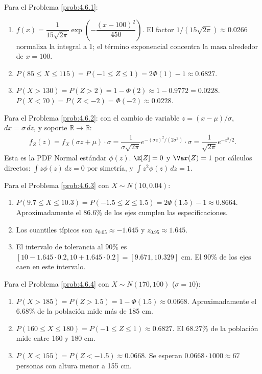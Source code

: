 \begin{solucion}
	\label{sol:4.6.1}
	Para el Problema \ref{prob:4.6.1}:
	\begin{enumerate}
		\item $f(x) = \dfrac{1}{15\sqrt{2\pi}} \exp\left(-\dfrac{(x-100)^{2}}{450}\right)$. El factor $1/(15\sqrt{2\pi}) \approx 0.0266$ normaliza la integral a 1; el término exponencial concentra la masa alrededor de $x = 100$.
		\item $P(85 \le X \le 115) = P(-1 \le Z \le 1) = 2\Phi(1) - 1 \approx 0.6827$.
		\item $P(X > 130) = P(Z > 2) = 1 - \Phi(2) \approx 1 - 0.9772 = 0.0228$. $P(X < 70) = P(Z < -2) = \Phi(-2) \approx 0.0228$.
	\end{enumerate}
\end{solucion}

\begin{solucion}
	\label{sol:4.6.2}
	Para el Problema \ref{prob:4.6.2}: con el cambio de variable $z = (x - \mu)/\sigma$, $dx = \sigma\,dz$, y soporte $\mathbb{R} \to \mathbb{R}$:
	\begin{align*}
		f_{Z}(z) = f_{X}(\sigma z + \mu) \cdot \sigma = \dfrac{1}{\sigma\sqrt{2\pi}} e^{-(\sigma z)^{2}/(2\sigma^{2})} \cdot \sigma = \dfrac{1}{\sqrt{2\pi}} e^{-z^{2}/2}.
	\end{align*}
	Esta es la PDF Normal estándar $\phi(z)$. $\E[Z] = 0$ y $\Var(Z) = 1$ por cálculos directos: $\int z\phi(z)\,dz = 0$ por simetría, y $\int z^{2}\phi(z)\,dz = 1$. \quad \qedhere
\end{solucion}

\begin{solucion}
	\label{sol:4.6.3}
	Para el Problema \ref{prob:4.6.3} con $X \sim N(10, 0.04)$:
	\begin{enumerate}
		\item $P(9.7 \le X \le 10.3) = P(-1.5 \le Z \le 1.5) = 2\Phi(1.5) - 1 \approx 0.8664$. Aproximadamente el 86.6\% de los ejes cumplen las especificaciones.
		\item Los cuantiles típicos son $z_{0.05} \approx -1.645$ y $z_{0.95} \approx 1.645$.
		\item El intervalo de tolerancia al 90\% es $[10 - 1.645 \cdot 0.2, 10 + 1.645 \cdot 0.2] = [9.671, 10.329]$ cm. El 90\% de los ejes caen en este intervalo.
	\end{enumerate}
\end{solucion}

\begin{solucion}
	\label{sol:4.6.4}
	Para el Problema \ref{prob:4.6.4} con $X \sim N(170, 100)$ ($\sigma = 10$):
	\begin{enumerate}
		\item $P(X > 185) = P(Z > 1.5) = 1 - \Phi(1.5) \approx 0.0668$. Aproximadamente el 6.68\% de la población mide más de 185 cm.
		\item $P(160 \le X \le 180) = P(-1 \le Z \le 1) \approx 0.6827$. El 68.27\% de la población mide entre 160 y 180 cm.
		\item $P(X < 155) = P(Z < -1.5) \approx 0.0668$. Se esperan $0.0668 \cdot 1000 \approx 67$ personas con altura menor a 155 cm.
	\end{enumerate}
\end{solucion}

